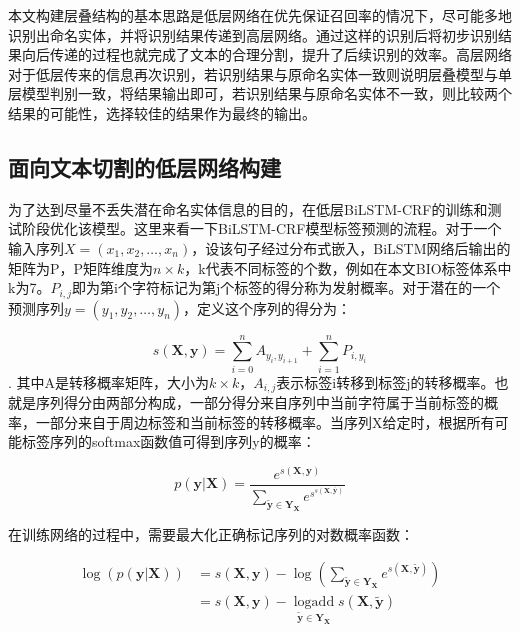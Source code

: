 \documentclass[winfonts,master,oneside,nobackinfo]{njuthesis}
\begin{document}
本文构建层叠结构的基本思路是低层网络在优先保证召回率的情况下，尽可能多地识别出命名实体，并将识别结果传递到高层网络。通过这样的识别后将初步识别结果向后传递的过程也就完成了文本的合理分割，提升了后续识别的效率。高层网络对于低层传来的信息再次识别，若识别结果与原命名实体一致则说明层叠模型与单层模型判别一致，将结果输出即可，若识别结果与原命名实体不一致，则比较两个结果的可能性，选择较佳的结果作为最终的输出。

\subsection{面向文本切割的低层网络构建}

为了达到尽量不丢失潜在命名实体信息的目的，在低层BiLSTM-CRF的训练和测试阶段优化该模型。这里来看一下BiLSTM-CRF模型标签预测的流程。对于一个输入序列$X=\left(x_{1}, x_{2}, \ldots, x_{n}\right)$，设该句子经过分布式嵌入，BiLSTM网络后输出的矩阵为P，P矩阵维度为$n \times k$，k代表不同标签的个数，例如在本文BIO标签体系中k为7。$P_{i, j}$即为第i个字符标记为第j个标签的得分称为发射概率。对于潜在的一个预测序列$y=\left(y_{1}, y_{2}, \ldots, y_{n}\right)$，定义这个序列的得分为：

\begin{equation} 
s(\bm{X}, \bm{y})=\sum_{i=0}^{n} A_{y_{i}, y_{i+1}}+\sum_{i=1}^{n} P_{i, y_{i}}
\end{equation}
.
其中A是转移概率矩阵，大小为$k \times k$，$A_{i, j}$表示标签i转移到标签j的转移概率。也就是序列得分由两部分构成，一部分得分来自序列中当前字符属于当前标签的概率，一部分来自于周边标签和当前标签的转移概率。当序列X给定时，根据所有可能标签序列的softmax函数值可得到序列y的概率：

\begin{equation} 
p(\bm{y} | \bm{X})=\frac{e^{s(\bm{X}, \bm{y})}}{\sum_{\tilde{\bm{y}} \in \bm{Y}_{\bm{X}}} e^{s^{s(\bm{X}, \overline{\bm{y}})}}}
\end{equation}

在训练网络的过程中，需要最大化正确标记序列的对数概率函数：

\begin{equation} 
\begin{aligned} \log (p(\bm{y} | \bm{X})) &=s(\bm{X}, \bm{y})-\log \left(\sum_{\tilde{\bm{y}} \in \bm{Y}_{\bm{X}}} e^{s(\bm{X}, \widetilde{\bm{y}})}\right) \\ &=s(\bm{X}, \bm{y})-\operatorname*{logadd}\limits_{\widetilde{\bm{y}} \in \bm{Y}_{\bm{X}}} s(\bm{X}, \widetilde{\bm{y}}) \end{aligned}
\end{equation}
\end{document}
